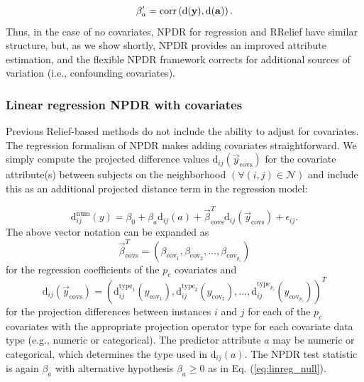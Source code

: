 \documentclass[10pt]{article}
\begin{document}
\begin{equation}
\beta'_a = \text{corr}\left( \bf{\text{d}}(\bf{y}), \bf{\text{d}}(\bf{a}) \right).
\end{equation}
Thus, in the case of no covariates, NPDR for regression and RRelief have similar structure, but, as we show shortly, NPDR provides an improved attribute estimation, and the flexible NPDR framework corrects for additional sources of variation (i.e., confounding covariates).   


\subsubsection{Linear regression NPDR with covariates}
Previous Relief-based methods do not include the ability to adjust for covariates. The regression formalism of NPDR makes adding covariates straightforward. We simply compute the projected difference values $\text{d}_{ij}(\vec{y}_{\text{covs}})$ for the covariate attribute(s) between subjects on the neighborhood $(\forall(i,j) \in \mathcal{N})$ and include this as an additional projected distance term in the regression model:

\begin{equation}\label{eq:lin_reg_cov}
    \text{d}^{\text{num}}_{ij}(y) = \beta_{0} + \beta_{a} \text{d}_{ij}(a) + \vec{\beta}^{T}_{\text{covs}}\text{d}_{ij}(\vec{y}_{\text{covs}}) + \epsilon_{ij}.
\end{equation}
The above vector notation can be expanded as  
\begin{equation}
\vec{\beta}^{T}_{\text{covs}} = \left( \beta_{\text{cov}_1}, \beta_{\text{cov}_2}, \ldots,  \beta_{\text{cov}_{p_c}} \right)
\end{equation}
for the regression coefficients of the $p_c$ covariates and 
\begin{equation}
\text{d}_{ij}(\vec{y}_\text{covs})= \left( \text{d}^{\text{type}_1}_{ij}({y}_{\text{cov}_1}), \text{d}^{\text{type}_2}_{ij}({y}_{\text{cov}_2}), \ldots, \text{d}^{\text{type}_{p_c}}_{ij}({y}_{\text{cov}_{p_c}}) \right)^{T}
\end{equation}
for the projection differences between instances $i$ and $j$ for each of the $p_c$ covariates with the appropriate projection operator type for each covariate data type (e.g., numeric or categorical). The predictor attribute $a$ may be numeric or categorical, which determines the type used in $\text{d}_{ij}(a)$. The NPDR test statistic is again $\beta_a$ with alternative hypothesis $\beta_a \ge 0$ as in Eq. (\ref{eq:linreg_null}). 
\end{document}
